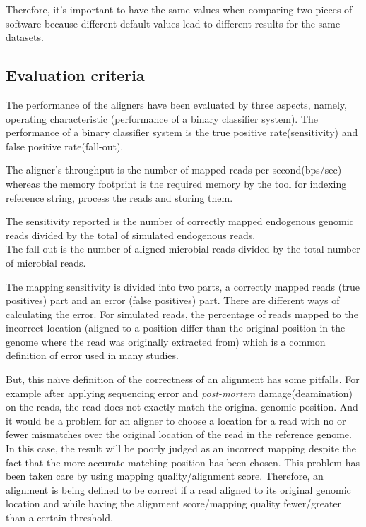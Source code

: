 \documentclass[11pt,a4paper]{report}
\begin{document}
Therefore, it's important to have the same values when comparing two pieces of software because different default values lead to different results for the same datasets.\\


\subsection{Evaluation criteria}
The performance of the aligners have been evaluated by three aspects, namely, 
operating characteristic (performance of a binary classifier system).
The performance of a binary classifier system is the true positive rate(sensitivity) and false positive rate(fall-out).


The aligner's throughput is the number of mapped reads per second(bps/sec)
whereas the memory footprint is the required memory by the tool for indexing reference string, process the reads and storing them. 

The sensitivity reported is the number of correctly mapped 
endogenous genomic reads divided by the total  of simulated endogenous reads.\\ 
The fall-out is the number of aligned  microbial reads 
divided by the total number of  microbial reads.

The mapping sensitivity is divided into two parts, a correctly mapped reads (true positives) part and an error (false positives) part. 
There are different ways of calculating the error. For simulated reads,
 the percentage of reads mapped to the incorrect location (aligned to a position differ than the original position in the genome where the read was originally extracted from) which is a common definition of error used in many studies\cite{ErrorDef}. 

But, this na\"\i ve definition of the correctness of an alignment has some pitfalls. For example after applying sequencing error and \emph{post-mortem} damage(deamination) on the reads, the read does not exactly match the original genomic position. And it would be a problem for an aligner to choose a location for a read with no or fewer mismatches over the original location of the read in the reference genome. In this case, the result will be poorly judged as an incorrect mapping despite the fact that the more accurate matching position has been chosen. 
This problem has been taken care by using mapping quality/alignment score. Therefore, an alignment is being defined to be correct if a read aligned to its original genomic location and while having the alignment score/mapping quality fewer/greater than a certain threshold. 
\end{document}
